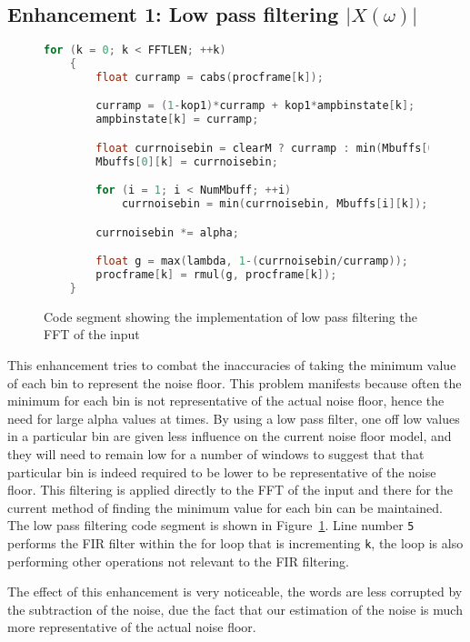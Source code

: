 \documentclass[11pt]{article} %
\begin{document}
\begin{raggedright}
\section{Enhancement 1: Low pass filtering $\lvert X(\omega) \rvert $} 
\begin{figure}[htbp]
	\begin{center}
    \begin{lstlisting}[language = C]
for (k = 0; k < FFTLEN; ++k)
	{
		float curramp = cabs(procframe[k]); 

		curramp = (1-kop1)*curramp + kop1*ampbinstate[k];
		ampbinstate[k] = curramp;

		float currnoisebin = clearM ? curramp : min(Mbuffs[0][k], curramp);
		Mbuffs[0][k] = currnoisebin;

		for (i = 1; i < NumMbuff; ++i)
			currnoisebin = min(currnoisebin, Mbuffs[i][k]);

		currnoisebin *= alpha;

		float g = max(lambda, 1-(currnoisebin/curramp));
		procframe[k] = rmul(g, procframe[k]);
	}
    \end{lstlisting}
  \end{center}
	\caption{Code segment showing the implementation of low pass filtering the FFT of the input}
	\label{code:LPFxOMG}
\end{figure}

This enhancement tries to combat the inaccuracies of taking the minimum value of each bin to represent the noise floor. This problem manifests because often the minimum for each bin is not representative of the actual noise floor, hence the need for large alpha values at times. By using a low pass filter, one off low values in a particular bin are given less influence on the current noise floor model, and they will need to remain low for a number of windows to suggest that that particular bin is indeed required to be lower to be representative of the noise floor. This filtering is applied directly to the FFT of the input and there for the current method of finding the minimum value for each bin can be maintained. The low pass filtering code segment is shown in Figure~\ref{code:LPFxOMG}.  Line number \verb"5" performs the FIR filter within the for loop that is incrementing \verb"k", the loop is also performing other operations not relevant to the FIR filtering. 

The effect of this enhancement is very noticeable, the words are less corrupted by the subtraction of the noise, due the fact that our estimation of the noise is much more representative of the actual noise floor.   



\end{raggedright}
\end{document}

